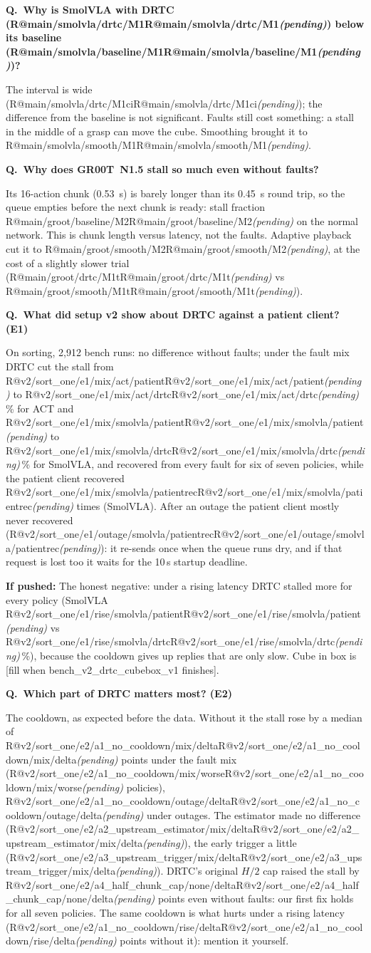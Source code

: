 \documentclass[11pt,a4paper]{article}
\makeatletter
\newcommand{\R}[1]{\ifcsname R@#1\endcsname\csname R@#1\endcsname\else\pending\fi}
\newcommand{\pending}{\textit{\color{warn}(pending)}}
\newcommand{\drtc}{DRTC}
\newcommand{\smolvla}{SmolVLA}
\newcommand{\groot}{GR00T~N1.5}
\newcounter{qn}
\newcommand{\q}[2]{\stepcounter{qn}\par\medskip
  {\bfseries\color{accent}Q\theqn.\ #1}\par\nopagebreak[4]#2\par}
\newcommand{\push}[1]{\par{\small\color{muted}\textbf{If pushed:} #1}}
\newcommand{\todo}[1]{{\color{warn}[#1]}}
\makeatother
\begin{document}
\q{Why is \smolvla{} with \drtc{} (\R{main/smolvla/drtc/M1}) below its baseline (\R{main/smolvla/baseline/M1})?}{The
interval is wide (\R{main/smolvla/drtc/M1ci}); the difference from the baseline is not significant. Faults still
cost something: a stall in the middle of a grasp can move the cube. Smoothing brought it to
\R{main/smolvla/smooth/M1}.}

\q{Why does \groot{} stall so much even without faults?}{Its 16-action chunk (0.53~s) is barely longer than its
0.45~s round trip, so the queue empties before the next chunk is ready: stall fraction \R{main/groot/baseline/M2} on
the normal network. This is chunk length versus latency, not the faults. Adaptive playback cut it to
\R{main/groot/smooth/M2}, at the cost of a slightly slower trial (\R{main/groot/drtc/M1t} vs \R{main/groot/smooth/M1t}).}

\q{What did setup v2 show about \drtc{} against a patient client? (E1)}{On sorting, 2{,}912 bench runs: no
difference without faults; under the fault mix \drtc{} cut the stall from \R{v2/sort_one/e1/mix/act/patient} to \R{v2/sort_one/e1/mix/act/drtc}\,\% for ACT and \R{v2/sort_one/e1/mix/smolvla/patient} to \R{v2/sort_one/e1/mix/smolvla/drtc}\,\% for \smolvla{}, and recovered from every fault for six of seven policies, while the patient client recovered \R{v2/sort_one/e1/mix/smolvla/patientrec} times (\smolvla). After an outage the patient client mostly never recovered (\R{v2/sort_one/e1/outage/smolvla/patientrec}): it re-sends once when the queue runs dry, and if that request is lost too it waits for the 10\,s startup deadline. \push{The honest negative: under a rising latency \drtc{} stalled more for every policy (\smolvla{} \R{v2/sort_one/e1/rise/smolvla/patient} vs \R{v2/sort_one/e1/rise/smolvla/drtc}\,\%), because the cooldown gives up replies that are only slow.} Cube in box is \todo{fill when bench\_v2\_drtc\_cubebox\_v1 finishes}.}

\q{Which part of \drtc{} matters most? (E2)}{The cooldown, as expected before the data. Without it the stall rose
by a median of \R{v2/sort_one/e2/a1_no_cooldown/mix/delta} points under the fault mix (\R{v2/sort_one/e2/a1_no_cooldown/mix/worse} policies), \R{v2/sort_one/e2/a1_no_cooldown/outage/delta} under outages. The estimator made no difference (\R{v2/sort_one/e2/a2_upstream_estimator/mix/delta}), the early trigger a little (\R{v2/sort_one/e2/a3_upstream_trigger/mix/delta}). \drtc's original $H/2$ cap raised the stall by \R{v2/sort_one/e2/a4_half_chunk_cap/none/delta} points even without faults: our first fix holds for all seven policies. The same cooldown is what hurts under a rising latency (\R{v2/sort_one/e2/a1_no_cooldown/rise/delta} points without it): mention it yourself.}
\end{document}
